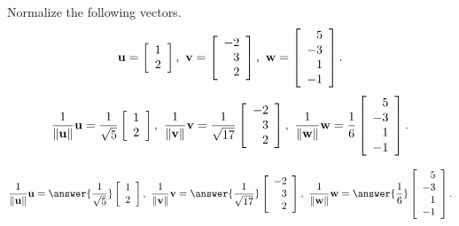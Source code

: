 \documentclass{ximera}
\author{Zack Reed}
\begin{document}
\begin{problem}

  Normalize the following vectors.
  \begin{equation*}
    \vect{u}=\startmat{r}1\\2\stopmat, \quad
    \vect{v}=\startmat{r}-2\\3\\2\stopmat, \quad
    \vect{w}=\startmat{r}5\\-3\\1\\-1\stopmat.
  \end{equation*}
  \begin{equation*}
    \frac{1}{\norm{\vect{u}}}\vect{u} = \frac{1}{\sqrt{5}}\startmat{r}1\\2\stopmat,\quad
    \frac{1}{\norm{\vect{v}}}\vect{v} = \frac{1}{\sqrt{17}}\startmat{r}-2\\3\\2\stopmat,\quad
    \frac{1}{\norm{\vect{w}}}\vect{w} = \frac{1}{6}\startmat{r}5\\-3\\1\\-1\stopmat.
  \end{equation*}

  \begin{equation*}
    \frac{1}{\norm{\vect{u}}}\vect{u} = \answer{\frac{1}{\sqrt{5}}}\startmat{r}1\\2\stopmat,\quad
    \frac{1}{\norm{\vect{v}}}\vect{v} = \answer{\frac{1}{\sqrt{17}}}\startmat{r}-2\\3\\2\stopmat,\quad
    \frac{1}{\norm{\vect{w}}}\vect{w} = \answer{\frac{1}{6}}\startmat{r}5\\-3\\1\\-1\stopmat.
  \end{equation*}

\end{problem}
\end{document}
